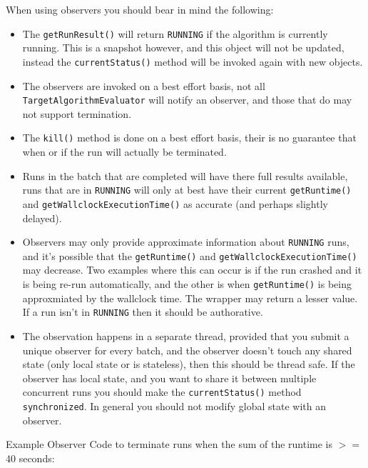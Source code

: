\documentclass[11pt,letterpaper,oneside]{article}
\begin{document}
When using observers you should bear in mind the following:
\begin{itemize}
\item The \texttt{getRunResult()} will return \texttt{RUNNING} if the algorithm is currently running. This is a snapshot however, and this object will not be updated, instead the \texttt{currentStatus()} method will be invoked again with new objects.

\item The observers are invoked on a best effort basis, not all \texttt{TargetAlgorithmEvaluator} will notify an observer, and those that do may not support termination.

\item The \texttt{kill()} method is done on a best effort basis, their is no guarantee that when or if the run will actually be terminated.

\item Runs in the batch that are completed will have there full results available, runs that are in \texttt{RUNNING} will only at best have their current \texttt{getRuntime()} and \texttt{getWallclockExecutionTime()} as accurate (and perhaps slightly delayed).

\item Observers may only provide approximate information about \texttt{RUNNING} runs, and it's possible that the \texttt{getRuntime()} and \texttt{getWallclockExecutionTime()} may decrease. Two examples where this can occur is if the run crashed and it is being re-run automatically, and the other is when \texttt{getRuntime()} is being approxmiated by the wallclock time. The wrapper may return a lesser value. If a run isn't in \texttt{RUNNING} then it should be authorative.

\item The observation happens in a separate thread, provided that you submit a unique observer for every batch, and the observer doesn't touch any shared state (only local state or is stateless), then this should be thread safe. If the observer has local state, and you want to share it between multiple concurrent runs you should make the \texttt{currentStatus()} method \texttt{synchronized}. In general you should not modify global state with an observer.

\end{itemize}

\pagebreak
Example Observer Code to terminate runs when the sum of the runtime is $>=$ 40 seconds:
\end{document}
